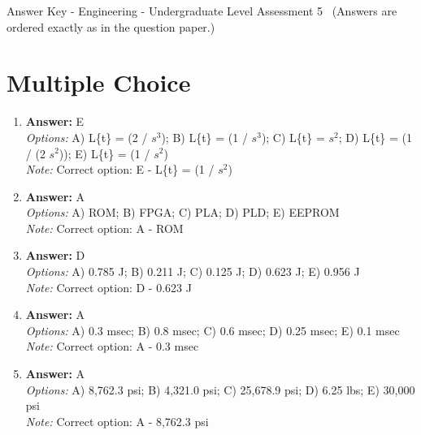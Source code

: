 \documentclass[12pt]{article}
\begin{document}
\begin{center}
Answer Key - Engineering - Undergraduate Level Assessment 5 \
\small (Answers are ordered exactly as in the question paper.)
\end{center}

\section*{Multiple Choice}
\begin{enumerate}[label=\arabic*.]
\item \textbf{Answer:} E
\\ \textit{Options:} A) L\{t\} = (2 / $s^3$); B) L\{t\} = (1 / $s^3$); C) L\{t\} = $s^2$; D) L\{t\} = (1 / (2 $s^2$)); E) L\{t\} = (1 / $s^2$)
\\ \textit{Note:} Correct option: E - L\{t\} = (1 / $s^2$)
\item \textbf{Answer:} A
\\ \textit{Options:} A) ROM; B) FPGA; C) PLA; D) PLD; E) EEPROM
\\ \textit{Note:} Correct option: A - ROM
\item \textbf{Answer:} D
\\ \textit{Options:} A) 0.785 J; B) 0.211 J; C) 0.125 J; D) 0.623 J; E) 0.956 J
\\ \textit{Note:} Correct option: D - 0.623 J
\item \textbf{Answer:} A
\\ \textit{Options:} A) 0.3 msec; B) 0.8 msec; C) 0.6 msec; D) 0.25 msec; E) 0.1 msec
\\ \textit{Note:} Correct option: A - 0.3 msec
\item \textbf{Answer:} A
\\ \textit{Options:} A) 8,762.3 psi; B) 4,321.0 psi; C) 25,678.9 psi; D) 6.25 lbs; E) 30,000 psi
\\ \textit{Note:} Correct option: A - 8,762.3 psi
\end{enumerate}
\end{document}
